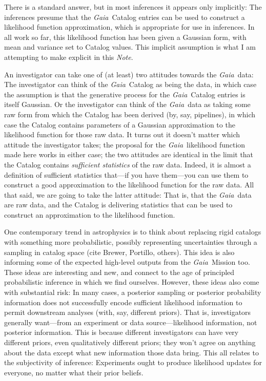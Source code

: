 \documentclass[12pt]{article}
\newcommand{\Gaia}{\textsl{Gaia}}
\newcommand{\documentname}{\textsl{Note}}
\begin{document}
There is a standard answer, but in most inferences it appears only implicitly:
The inferences presume that the \Gaia\ Catalog entries can be used to construct
a likelihood function approximation, which is appropriate for use in inferences.
In all work so far, this likelihood function has been given a Gaussian form,
with mean and variance set to Catalog values.
This implicit assumption is what I am attempting to make explicit in this \documentname.

An investigator can take one of (at least) two attitudes towards the \Gaia\ data:
The investigator can think of the \Gaia\ Catalog as being the data, in which case
the assumption is that the generative process for the \Gaia\ Catalog entries is
itself Gaussian.
Or the investigator can think of the \Gaia\ data as taking some raw form
from which the Catalog has been derived (by, say, pipelines),
in which case the Catalog contains parameters of a Gaussian
approximation to the likelihood function for those raw data.
It turns out it doesn't matter which attitude the investigator takes; the
proposal for the \Gaia\ likelihood function made here works in either case;
the two attitudes are identical in the limit that the Catalog contains
\emph{sufficient statistics} of the raw data.
Indeed, it is almost a definition of sufficient statistics that---if you have them---you
can use them to construct a good approximation to the likelihood function for the
raw data.
All that said, we are going to take the latter attitude: That is, that the
\Gaia\ data are raw data, and the Catalog is delivering statistics that can
be used to construct an approximation to the likelihood function.

One contemporary trend in astrophysics is to think about replacing rigid
catalogs with something more probabilistic, possibly representing uncertainties
through a sampling in catalog space (cite Brewer, Portillo, others).
This idea is also informing some of the expected high-level outputs from
the \Gaia\ Mission too.
These ideas are interesting and new, and connect to the age of principled
probabilistic inference in which we find ourselves.
However, these ideas also come with substantial risk:
In many cases, a posterior sampling or posterior probability information
does not successfully encode sufficient likelihood information to permit
downstream analyses (with, say, different priors).
That is, investigators generally want---from an experiment or data source---likelihood
information, not posterior information.
This is because different investigators can have very different priors,
even qualitatively different priors; they won't agree on anything about the
data except what new information those data bring.
This all relates to the subjectivity of inference:
Experiments ought to produce likelihood updates for everyone, no matter
what their prior beliefs.
\end{document}
